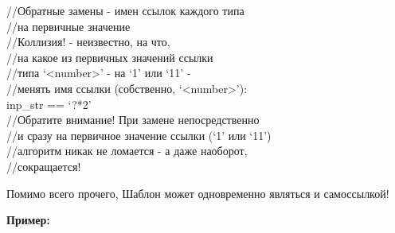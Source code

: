 \documentclass{book}
\newcommand{\less}{\textless}
\newcommand{\more}{\textgreater}
\begin{document}
\begin{tcolorbox}[breakable]
//Обратные замены - имен ссылок каждого типа \\
//на первичные значение \\
//Коллизия! - неизвестно, на что, \\
//на какое из первичных значений ссылки \\
//типа `\less number\more' - на `1' или `11' - \\
//менять имя ссылки (собственно, `\less number\more'): \\
inp\_str == `?*2' \\
//Обратите внимание! При замене непосредственно \\
//и сразу на первичное значение ссылки (`1' или `11') \\
//алгоритм никак не ломается - а даже наоборот, \\
//сокращается!
\end{tcolorbox}

Помимо всего прочего, Шаблон может одновременно являться и самоссылкой!

\textbf{Пример:}
\end{document}
